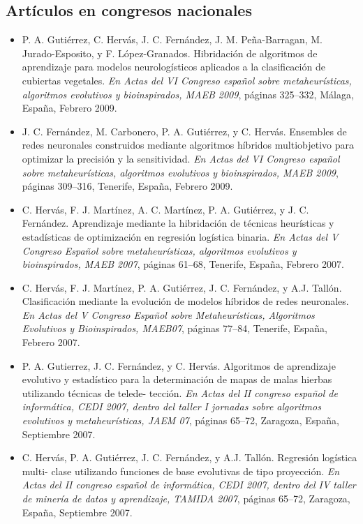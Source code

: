 \subsection{Artículos en congresos nacionales}
\begin{itemize}
	\item P. A. Gutiérrez, C. Hervás, J. C. Fernández, J. M. Peña-Barragan, M. Jurado-Esposito, y
			F. López-Granados. Hibridación de algoritmos de aprendizaje para modelos neurologísticos
			aplicados a la clasificación de cubiertas vegetales. \textit{ En Actas del VI Congreso
			español sobre	metaheurísticas, algoritmos evolutivos y bioinspirados, MAEB 2009},
			páginas 325–332, Málaga, España, Febrero 2009.
	\item J. C. Fernández, M. Carbonero, P. A. Gutiérrez, y C. Hervás. Ensembles de redes
			neuronales construidos mediante algoritmos híbridos multiobjetivo para optimizar la
			precisión y la sensitividad. \textit{En Actas del VI Congreso español sobre
metaheurísticas,
			algoritmos evolutivos y bioinspirados, MAEB 2009}, páginas 309–316, Tenerife, España,
			Febrero 2009.
	\item C. Hervás, F. J. Martínez, A. C. Martínez, P. A. Gutiérrez, y J. C. Fernández. Aprendizaje
			mediante la hibridación de técnicas heurísticas y estadísticas de optimización en
			regresión logística binaria. \textit{En Actas del V Congreso Español sobre metaheurísticas,
			algoritmos evolutivos y bioinspirados, MAEB 2007}, páginas 61–68, Tenerife, España,
			Febrero	2007.
	\item C. Hervás, F. J. Martínez, P. A. Gutiérrez, J. C. Fernández, y A.J. Tallón. Clasificación
			mediante la evolución de modelos híbridos de redes neuronales. \textit{En Actas del V
			Congreso	Español sobre Metaheurísticas, Algoritmos Evolutivos y Bioinspirados,
			MAEB07}, páginas 77–84, Tenerife, España, Febrero 2007.
	\item P. A. Gutierrez, J. C. Fernández, y C. Hervás. Algoritmos de aprendizaje evolutivo y
			estadístico para la determinación de mapas de malas hierbas utilizando técnicas de telede-
			tección. \textit{En Actas del II congreso español de informática, CEDI 2007, dentro del
			taller I	jornadas sobre algoritmos evolutivos y metaheurísticas, JAEM 07}, páginas
			65–72, Zaragoza,	España, Septiembre 2007.
	\item C. Hervás, P. A. Gutiérrez, J. C. Fernández, y A.J. Tallón. Regresión logística multi-
			clase utilizando funciones de base evolutivas de tipo proyección. \textit{En Actas del II
			congreso	español de informática, CEDI 2007, dentro del IV taller de minería de datos
			y aprendizaje,	TAMIDA 2007}, páginas 65–72, Zaragoza, España, Septiembre 2007.
\end{itemize}
\newpage
